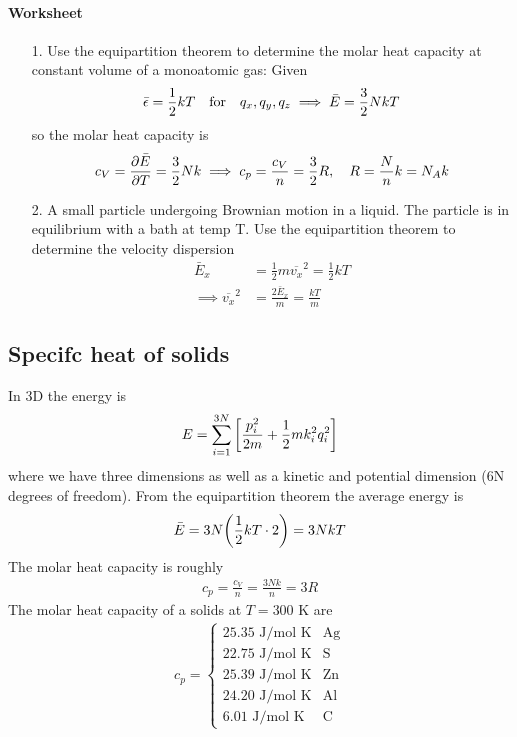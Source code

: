 \documentclass[../main.tex]{subfiles}
\begin{document}
\paragraph{Worksheet}
\begin{itemize}
    \item [1.] Use the equipartition theorem to determine the molar heat capacity at constant volume of a monoatomic gas: Given
    \begin{align*}
        \bar \epsilon = \frac{1}{2} kT \qqtext{for} q_x, q_y, q_z \implies \bar E = \frac{3}{2} N kT
    \end{align*}
    so the molar heat capacity is
    \begin{align*}
        c_V = \pdv{\bar E}{T} = \frac{3}{2} N k \implies c_p = \frac{c_V}{n} = \frac{3}{2} R ,\quad R = \frac{N}{n} k = N_A k
    \end{align*}
    \item [2.] A small particle undergoing Brownian motion in a liquid. The particle is in equilibrium with a bath at temp T.
    Use the equipartition theorem to determine the velocity dispersion
    \begin{align*}
        \bar E_x &= \frac{1}{2} m \overline{v_x}^2 = \frac{1}{2} kT \\
        \implies \overline{v_x}^2 &= \frac{2\bar E_x}{m} = \frac{kT}{m}
    \end{align*}
\end{itemize}

\subsection{Specifc heat of solids}
In 3D the energy is
\begin{align*}
    E = \sum_{i=1}^{3N} \qt[
        \frac{p_i^2}{2m} + \frac{1}{2} m k_i^2 q_i^2
    ]
\end{align*}
where we have three dimensions as well as a kinetic and potential dimension (6N degrees of freedom).
From the equipartition theorem the average energy is
\begin{align*}
    \bar E = 3N \qt(\frac{1}{2} kT \cdot 2) = 3N kT
\end{align*}
The molar heat capacity is roughly
\begin{align*}
    c_p = \frac{c_V}{n} = \frac{3Nk}{n} = 3R
\end{align*}
The molar heat capacity of a solids at $T = 300$ K are
\begin{align*}
    c_p = \begin{cases}
        25.35 \text{ J/mol K} & \text{Ag} \\
        22.75 \text{ J/mol K} & \text{S} \\
        25.39 \text{ J/mol K} & \text{Zn} \\
        24.20 \text{ J/mol K} & \text{Al} \\
        6.01 \text{ J/mol K} & \text{C}
    \end{cases}
\end{align*}
\end{document}
